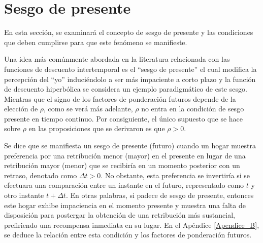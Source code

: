 
\section{Sesgo de presente}
En esta sección, se examinará el concepto de sesgo de presente y las condiciones que deben cumplirse para que este fenómeno se manifieste.

Una idea más comúnmente abordada en la literatura relacionada con las funciones de descuento intertemporal es el “sesgo de presente” el cual modifica la percepción del “yo” induciéndolo a ser más impaciente a corto plazo y la función de descuento hiperbólica se considera un ejemplo paradigmático de este sesgo. Mientras que el signo de los factores de ponderación futuros depende de la elección de $\rho$, como se verá más adelante, $\rho$ no entra en la condición de sesgo presente en tiempo continuo. Por consiguiente, el único supuesto que se hace sobre $\rho$ en las proposiciones que se derivaron es que $\rho > 0$.

Se dice que se manifiesta un sesgo de presente (futuro) cuando un hogar muestra preferencia por una retribución menor (mayor) en el presente en lugar de una retribución mayor (menor) que se recibiría en un momento posterior con un retraso, denotado como $\Delta t > 0$. No obstante, esta preferencia se invertiría si se efectuara una comparación entre un instante en el futuro, representado como $t$ y otro instante $t + \Delta t$. En otras palabras, si padece de sesgo de presente, entonces este hogar exhibe impaciencia en el momento presente y muestra una falta de disposición para postergar la obtención de una retribución más sustancial, prefiriendo una recompensa inmediata en su lugar. En el Apéndice \ref{Apendice_B}, se deduce la relación entre esta condición y los factores de ponderación futuros.

